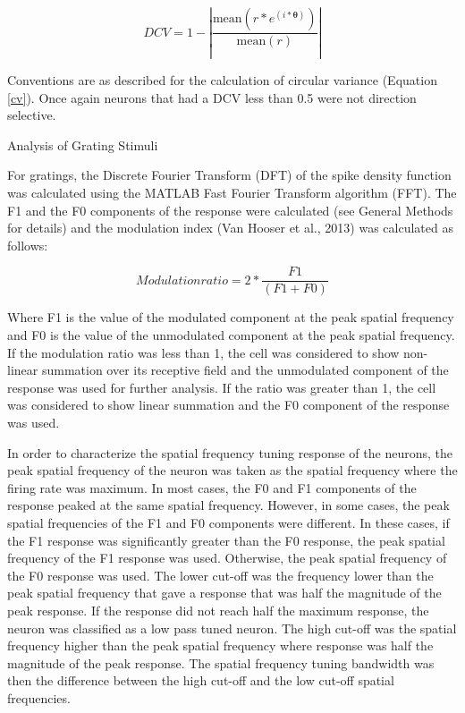 \begin{equation} \label{DCV}
DCV=
1 - |\frac{\text{mean}\left( r*e^{\left( i*\mathbf{\theta} \right)} \right)}{\text{mean}\left( r \right)}|
\end{equation}

Conventions are as described for the calculation of circular variance
(Equation \ref{cv}). Once again neurons that had a DCV less than 0.5 were not
direction selective.

{Analysis of Grating Stimuli}

For gratings, the Discrete Fourier Transform (DFT) of the spike density
function was calculated using the MATLAB Fast Fourier Transform
algorithm (FFT). The F1 and the F0 components of the response were
calculated (see General Methods for details) and the modulation index
(Van Hooser et al., 2013) was calculated as follows:

\begin{equation} \label{MI}
Modulation ratio=
2*\frac{F1}{(F1 + F0)}
\end{equation}

Where F1 is the value of the modulated component at the peak spatial
frequency and F0 is the value of the unmodulated component at the peak
spatial frequency. If the modulation ratio was less than 1, the cell was
considered to show non-linear summation over its receptive field and the
unmodulated component of the response was used for further analysis. If
the ratio was greater than 1, the cell was considered to show linear
summation and the F0 component of the response was used.

In order to characterize the spatial frequency tuning response of the
neurons, the peak spatial frequency of the neuron was taken as the
spatial frequency where the firing rate was maximum. In most cases, the
F0 and F1 components of the response peaked at the same spatial
frequency. However, in some cases, the peak spatial frequencies of the
F1 and F0 components were different. In these cases, if the F1 response
was significantly greater than the F0 response, the peak spatial
frequency of the F1 response was used. Otherwise, the peak spatial
frequency of the F0 response was used. The lower cut-off was the
frequency lower than the peak spatial frequency that gave a response
that was half the magnitude of the peak response. If the response did
not reach half the maximum response, the neuron was classified as a low
pass tuned neuron. The high cut-off was the spatial frequency higher
than the peak spatial frequency where response was half the magnitude of
the peak response. The spatial frequency tuning bandwidth was then the
difference between the high cut-off and the low cut-off spatial
frequencies.

